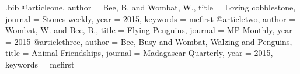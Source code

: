 \RequirePackage{filecontents}

\begin{filecontents}{\jobname.bib}
    @article{one,
        author = {Bee, B. and Wombat, W.},
        title = {Loving cobblestone},
        journal = {Stones weekly},
        year = {2015},
        keywords = {mefirst}
    }
    @article{two,
        author = {Wombat, W. and Bee, B.},
        title = {Flying Penguins},
        journal = {MP Monthly},
        year = {2015}
    }
    @article{three,
        author = {Bee, Busy and Wombat, Walzing and Penguins},
        title = {Animal Friendships},
        journal = {Madagascar Quarterly},
        year = {2015},
        keywords = {mefirst}
    }
\end{filecontents}
\documentclass{article}
\usepackage{biblatex}



[]{\section*{Refereed Publications}
\arabic{firstA} as first author, a total of \arabic{sum}\medbreak
}


\nocite{*}
\printbibliography

